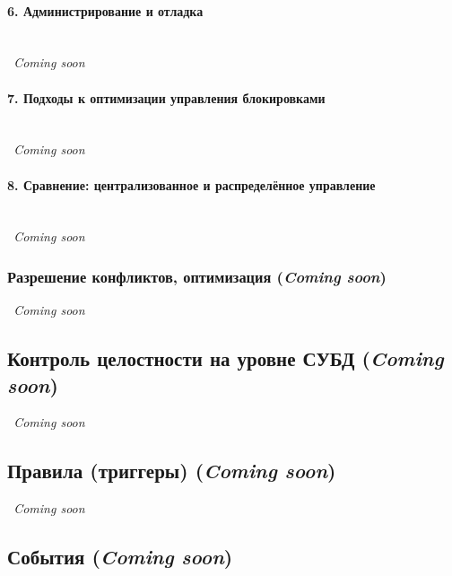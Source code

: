 \paragraph{6. Администрирование и отладка} ~\\
\textit{~Coming soon}

\paragraph{7. Подходы к оптимизации управления блокировками} ~\\
\textit{~Coming soon}

\paragraph{8. Сравнение: централизованное и распределённое управление} ~\\
\textit{~Coming soon}















\subsubsection{Разрешение конфликтов, оптимизация (\textit{Coming soon})}

\textit{~Coming soon}





\subsection{Контроль целостности на уровне СУБД (\textit{Coming soon})}
\textit{~Coming soon}





\subsection{Правила (триггеры) (\textit{Coming soon})}

\textit{~Coming soon}





\subsection{События (\textit{Coming soon})}


